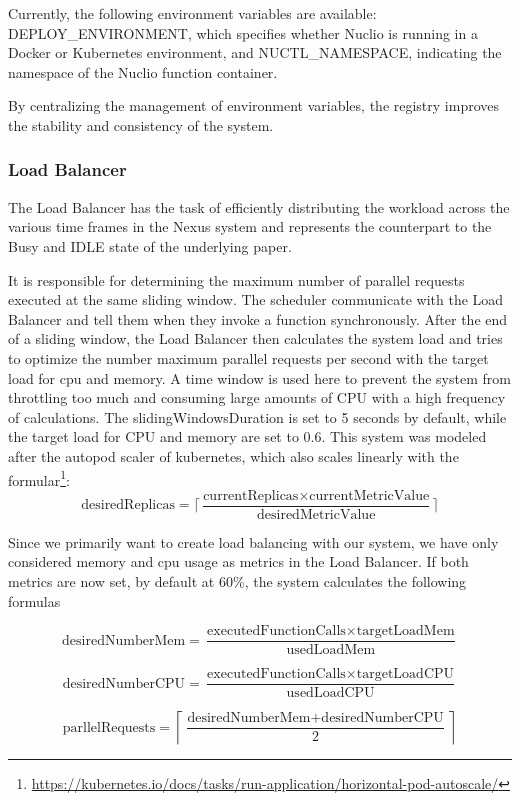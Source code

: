 Currently, the following environment variables are available: DEPLOY\_ENVIRONMENT, which specifies whether Nuclio is running in a Docker or Kubernetes environment, and NUCTL\_NAMESPACE, indicating the namespace of the Nuclio function container. 

By centralizing the management of environment variables, the registry improves the stability and consistency of the system.

\subsubsection{Load Balancer}
\label{sec:load-balancer}
The Load Balancer has the task of efficiently distributing the workload across the various time frames in the Nexus system and represents the counterpart to the Busy and IDLE state of the underlying paper\cite{schirmer2023profaastinate}.

It is responsible for determining the maximum number of parallel requests executed at the same sliding window. The scheduler communicate with the Load Balancer and tell them when they invoke a function synchronously. After the end of a sliding window, the Load Balancer then calculates the system load and tries to optimize the number maximum parallel requests per second with the target load for cpu and memory. A time window is used here to prevent the system from throttling too much and consuming large amounts of CPU with a high frequency of calculations. The slidingWindowsDuration is set to 5 seconds by default, while the target load for CPU and memory are set to 0.6.
This system was modeled after the autopod scaler of kubernetes, which also scales linearly with the formular\footnote{\url{https://kubernetes.io/docs/tasks/run-application/horizontal-pod-autoscale/}}:
{\small
\[
\text{desiredReplicas} = \lceil \dfrac{\text{currentReplicas} \times \text{currentMetricValue}}{\text{desiredMetricValue}}\rceil
\]
}

Since we primarily want to create load balancing with our system, we have only considered memory and cpu usage as metrics in the Load Balancer. If both metrics are now set, by default at 60\%, the system calculates the following formulas
{\small
\[
\text{desiredNumberMem} = \frac{\text{executedFunctionCalls} \times \text{targetLoadMem}}{\text{usedLoadMem}}
\]

\[
\text{desiredNumberCPU} = \frac{\text{executedFunctionCalls} \times \text{targetLoadCPU}}{\text{usedLoadCPU}}
\]

\[
\text{parllelRequests} = \left\lceil \frac{\text{desiredNumberMem} + \text{desiredNumberCPU}}{2} \right\rceil
\]
}


